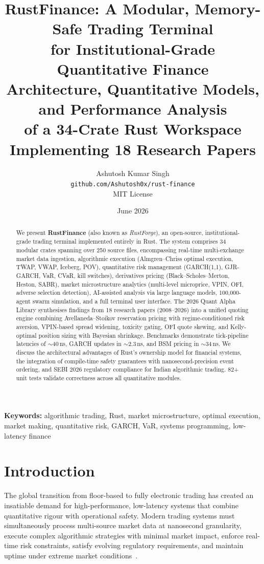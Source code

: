 \documentclass[11pt]{article}
\title{%
  \textbf{RustFinance: A Modular, Memory-Safe Trading Terminal\\
  for Institutional-Grade Quantitative Finance}\\[6pt]
  \large Architecture, Quantitative Models, and Performance Analysis\\
  of a 34-Crate Rust Workspace Implementing 18 Research Papers
}
\author{%
  Ashutosh Kumar Singh\\
  \texttt{github.com/Ashutosh0x/rust-finance}\\
  MIT License
}
\date{June 2026}
\theoremstyle{definition}
\begin{document}
\maketitle

\begin{abstract}
We present \textbf{RustFinance} (also known as \emph{RustForge}), an open-source,
institutional-grade trading terminal implemented entirely in Rust. The system
comprises 34 modular crates spanning over 250 source files, encompassing
real-time multi-exchange market data ingestion, algorithmic execution
(Almgren--Chriss optimal execution, TWAP, VWAP, Iceberg, POV), quantitative
risk management (GARCH(1,1), GJR-GARCH, VaR, CVaR, kill switches),
derivatives pricing (Black--Scholes--Merton, Heston, SABR), market
microstructure analytics (multi-level microprice, VPIN, OFI, adverse
selection detection), AI-assisted analysis via large language models,
100,000-agent swarm simulation, and a full terminal user interface.
The 2026 Quant Alpha Library synthesises findings from 18 research
papers (2008--2026) into a unified quoting engine combining
Avellaneda--Stoikov reservation pricing with regime-conditioned risk
aversion, VPIN-based spread widening, toxicity gating, OFI quote skewing,
and Kelly-optimal position sizing with Bayesian shrinkage. Benchmarks
demonstrate tick-pipeline latencies of $\sim$40\,ns, GARCH updates in
$\sim$2.3\,ns, and BSM pricing in $\sim$34\,ns. We discuss the architectural
advantages of Rust's ownership model for financial systems, the integration
of compile-time safety guarantees with nanosecond-precision event ordering,
and SEBI 2026 regulatory compliance for Indian algorithmic trading.
82+ unit tests validate correctness across all quantitative modules.
\end{abstract}

\textbf{Keywords:} algorithmic trading, Rust, market microstructure,
optimal execution, market making, quantitative risk, GARCH, VaR,
systems programming, low-latency finance

\section{Introduction}
\label{sec:intro}

The global transition from floor-based to fully electronic trading has
created an insatiable demand for high-performance, low-latency systems
that combine quantitative rigour with operational safety. Modern trading
systems must simultaneously process multi-source market data at
nanosecond granularity, execute complex algorithmic strategies with
minimal market impact, enforce real-time risk constraints, satisfy
evolving regulatory requirements, and maintain uptime under extreme
market conditions~\cite{almgren2000,avellaneda2008}.
\end{document}
